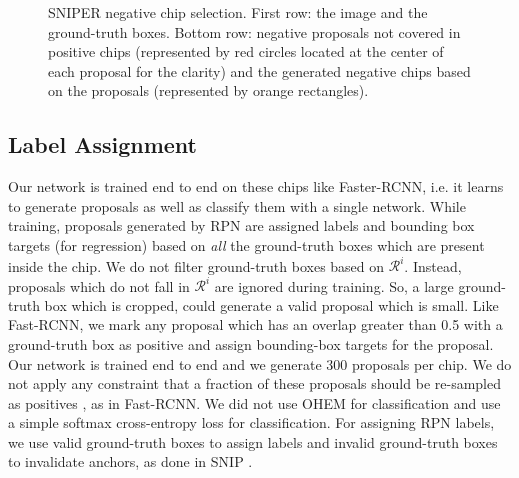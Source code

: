 \documentclass{article}
\begin{document}
\begin{figure}
\caption{SNIPER negative chip selection. First row: the image and the ground-truth boxes. Bottom row: negative proposals not covered in positive chips (represented by red circles located at the center of each proposal for the clarity) and the generated negative chips based on the proposals (represented by orange rectangles).}
\label{fig:neg_chips}
\end{figure} 

\subsection{Label Assignment}
Our network is trained end to end on these chips like Faster-RCNN, i.e. it learns to generate proposals as well as classify them with a single network. While training, proposals generated by RPN are assigned labels and bounding box targets (for regression) based on {\em all} the ground-truth boxes which are present inside the chip. We do not filter ground-truth boxes based on $\mathcal{R}^i$. Instead, proposals which do not fall in $\mathcal{R}^i$ are ignored during training. So, a large ground-truth box which is cropped, could generate a valid proposal which is small. Like Fast-RCNN, we mark any proposal which has an overlap greater than 0.5 with a ground-truth box as positive and assign bounding-box targets for the proposal. Our network is trained end to end and we generate 300 proposals per chip. We do not apply any constraint that a fraction of these proposals should be re-sampled as positives \cite{ren2015faster}, as in Fast-RCNN. We did not use OHEM \cite{shrivastava2016training} for classification and use a simple softmax cross-entropy loss for classification. For assigning RPN labels, we use valid ground-truth boxes to assign labels and invalid ground-truth boxes to invalidate anchors, as done in SNIP \cite{singh2017analysis}. 
\end{document}
